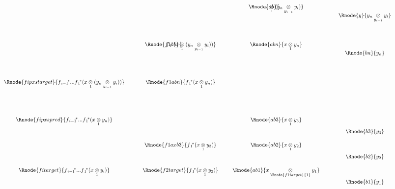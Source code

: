 \begin{displaymath}
\begin{array}{p{1.5cm}  c p{0.1cm} c c p {0.2cm} c  p{0.5cm} c}
&&&                                               &                     && \Rnode{ab}{\kern-0.9cm\crossx{x}{(\ynyi)}{1}}         &&                \\[2.0cm]
&&&                                               &  \Rnode{f1ab}{\kern-1cm\fonestar(\crossx{x}{(\ynyi)}{1})}&& \Rnode{abn}{\crossx{x}{y_n}{1}} && \\[2.0cm]
&\Rnode{fipxstarget}{\fipxstarget}&&                 &  \Rnode{f1abn}{\fonestar(\crossx{x}{y_n}{1})}&&                              &&                \\[2.0cm]
&\Rnode{fipxspred}{\fipxspred}&&                 &                              && \Rnode{ab3}{\crossx{x}{y_3}{1}} &&                \\[1.2cm]
&
&& &\Rnode{f1axb3}{\fonestar(\crossx{x}{y_3}{1})}  && \Rnode{ab2}{\crossx{x}{y_2}{1}}  &&           \\[1.2cm]
&\Rnode{fitarget}{\fitarget}&&&\Rnode{f2target}{\fonestar(\crossx{x}{y_2}{1})}  && \Rnode{ab1}{\crossx{x}{y_1}{\Rnode{f1target}{1}}}     \\[1.2cm]
&&&                                &&                          &                                                        \\[-12cm] %
&&&                                &&                          &           && \Rnode{y}{\ynyi}                          \\[2cm]
&&&                                &&                          &           && \Rnode{bn}{y_n}                           \\[0.3cm]
&&&                                &&                          &           &&                                           \\[3.9cm] %
&&&                                &&                          &           && \Rnode{b3}{y_3}                           \\[1.2cm]
&&&                                &&                          &           && \Rnode{b2}{y_2}                           \\[1.2cm]
&&&                                &&                          &           && \Rnode{b1}{y_1}                           \\[0.9cm]  %

\end{array}
\end{displaymath}
